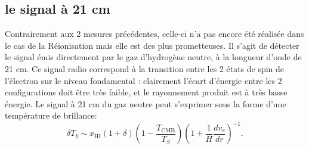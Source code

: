 
\subsection{le signal à 21 cm}
 Contrairement aux 2 mesures précédentes, celle-ci n'a pas encore été réalisée dans le cas de la Réionisation mais elle est des plus prometteuses. Il s'agit de détecter le signal émis directement par le gaz d'hydrogène neutre, à la longueur d'onde de 21 cm. Ce signal radio correspond à la transition entre les 2 états de spin de l'électron sur le niveau fondamental : clairement l'écart d'énergie entre les 2 configurations doit être très faible, et le rayonnement produit est à très basse énergie. Le signal à 21 cm du gaz neutre peut s'exprimer sous la forme d'une température de brillance:
 \begin{equation}
 \delta T_b \sim x_\mathrm{HI} (1+\delta) (1-\frac{T_\mathrm{CMB}}{T_S})(1+\frac{1}{H}\frac{d v_r}{dr})^{-1}.
 \end{equation}
